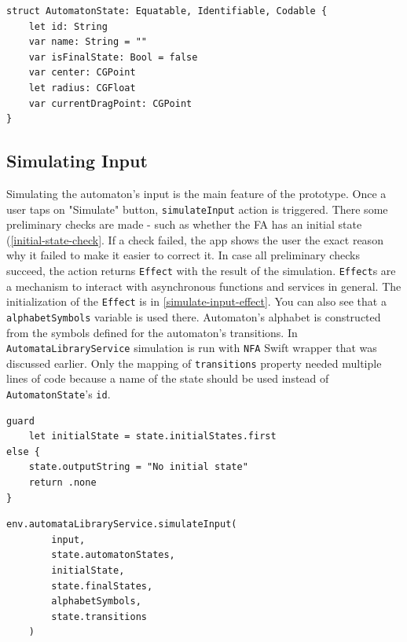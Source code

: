\begin{lstlisting}[caption={State model}, label=state-model]
struct AutomatonState: Equatable, Identifiable, Codable {
    let id: String
    var name: String = ""
    var isFinalState: Bool = false
    var center: CGPoint
    let radius: CGFloat
    var currentDragPoint: CGPoint
}
\end{lstlisting}

\subsection{Simulating Input}

Simulating the automaton's input is the main feature of the prototype. Once a user taps on "Simulate" button, \lstinline{simulateInput} action is triggered. There some preliminary checks are made - such as whether the FA has an initial state (\ref{initial-state-check}. If a check failed, the app shows the user the exact reason why it failed to make it easier to correct it. In case all preliminary checks succeed, the action returns \lstinline{Effect} with the result of the simulation. \lstinline{Effect}s are a mechanism to interact with asynchronous functions and services in general. The initialization of the \lstinline{Effect} is in \ref{simulate-input-effect}. You can also see that a \lstinline{alphabetSymbols} variable is used there. Automaton's alphabet is constructed from the symbols defined for the automaton's transitions. In \lstinline{AutomataLibraryService} simulation is run with \lstinline{NFA} Swift wrapper that was discussed earlier. Only the mapping of \lstinline{transitions} property needed multiple lines of code because a name of the state should be used instead of \lstinline{AutomatonState}'s \lstinline{id}.

\begin{lstlisting}[caption={Check for initial state}, label=initial-state-check]
guard
    let initialState = state.initialStates.first
else {
    state.outputString = "No initial state"
    return .none
}
\end{lstlisting}   

\begin{lstlisting}[caption={Effect for simulating input}, label=simulate-input-effect]
env.automataLibraryService.simulateInput(
        input,
        state.automatonStates,
        initialState,
        state.finalStates,
        alphabetSymbols,
        state.transitions
    )
\end{lstlisting}

